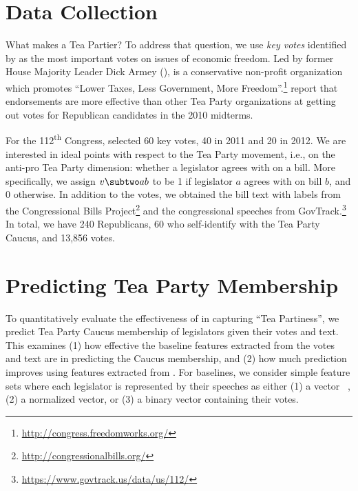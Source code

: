 
\section{Data Collection}
\label{sec:c6_data}


What makes a Tea Partier?  To address that question, we use
\textit{key votes} identified by \fw{} as the most important votes on
issues of economic freedom.  Led by former House Majority Leader Dick
Armey (), \fw{} is a conservative non-profit organization
which promotes ``Lower Taxes, Less Government, More
Freedom''.\footnote{\url{http://congress.freedomworks.org/}}
 report that \fw{} endorsements are
more effective than other Tea Party organizations at getting out votes
for Republican candidates in the 2010 midterms.

For the 112\textsuperscript{th} Congress, \fw{} selected 60 key votes,
40 in 2011 and 20 in 2012.  We are interested in ideal points with
respect to the Tea Party movement, i.e., on the anti-pro Tea Party
dimension: whether a legislator agrees with \fw{} on a bill. More
specifically, we assign $v \subtwo ab$ to be 1 if legislator $a$
agrees with \fw{} on bill $b$, and 0 otherwise. In addition to the votes, we obtained the bill text with labels from the Congressional Bills Project\footnote{\url{http://congressionalbills.org/}} and the congressional speeches from GovTrack.\footnote{\url{https://www.govtrack.us/data/us/112/}} In total, we have 240
Republicans, 60 who self-identify with the Tea Party Caucus, and
13,856 votes.


\section{Predicting Tea Party Membership}
\label{sec:c6_prediction}


To quantitatively evaluate the effectiveness of \name{} in
capturing ``Tea Partiness'', we predict Tea Party Caucus membership of
legislators given their votes and text. This examines (1) how effective the baseline
features extracted from the votes and text are in predicting the Caucus
membership, and (2) how much prediction improves using features extracted from \name{}.
For baselines, we consider simple feature sets where each legislator
is represented by their speeches as either (1) a \tfidf{}
vector ~\cite{salton-68}, (2) a normalized \tfidf{} vector, or (3) a binary vector
containing their votes.

